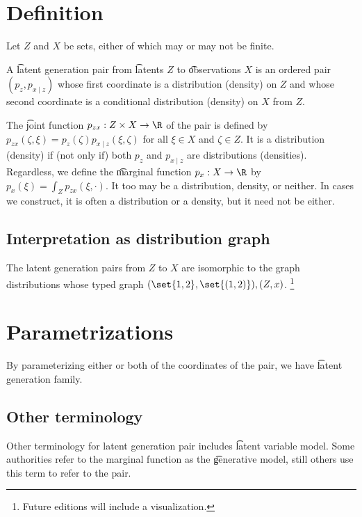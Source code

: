 
\section*{Definition}

Let $Z$ and $X$ be sets, either of which may or may not be finite.

A \t{latent generation pair} from \t{latents} $Z$ to \t{observations} $X$ is an ordered pair $(p_z, p_{x \mid z})$ whose first coordinate is a distribution (density) on $Z$ and whose second coordinate is a conditional distribution (density) on $X$ from $Z$.

The \t{joint function} $p_{zx}: Z \times X \to \R $ of the pair is defined by $p_{zx}(\zeta , \xi ) = p_{z}(\zeta )p_{x \mid z}(\xi , \zeta )$ for all $\xi  \in X$ and $\zeta  \in Z$.
It is a distribution (density) if (not only if) both $p_{z}$ and $p_{x \mid z}$ are distributions (densities).
Regardless, we define the \t{marginal function} $p_x: X \to \R $ by $p_x(\xi ) = \int_Z p_{zx}(\xi , \cdot )$.
It too may be a distribution, density, or neither.
In cases we construct, it is often a distribution or a density, but it need not be either.

\subsection*{Interpretation as distribution graph}

The latent generation pairs from $Z$ to $X$ are isomorphic to the graph distributions whose typed graph $(\set{1, 2}, \set{(1,2)}), (Z, x)$.
    \ifhmode\unskip\fi\footnote{
Future editions will include a visualization.
    }

\section*{Parametrizations}

By parameterizing either or both of the coordinates of the pair, we have \t{latent generation family}.

\subsection*{Other terminology}

Other terminology for latent generation pair includes \t{latent variable model}.
Some authorities refer to the marginal function as the \t{generative model}, still others use this term to refer to the pair.



\blankpage